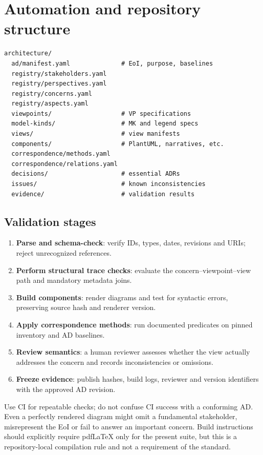 \documentclass[11pt,letterpaper]{article}
\begin{document}
\section{Automation and repository structure}
\begin{lstlisting}[caption={Illustrative architecture documentation layout}]
architecture/
  ad/manifest.yaml              # EoI, purpose, baselines
  registry/stakeholders.yaml
  registry/perspectives.yaml
  registry/concerns.yaml
  registry/aspects.yaml
  viewpoints/                   # VP specifications
  model-kinds/                  # MK and legend specs
  views/                        # view manifests
  components/                   # PlantUML, narratives, etc.
  correspondence/methods.yaml
  correspondence/relations.yaml
  decisions/                    # essential ADRs
  issues/                       # known inconsistencies
  evidence/                     # validation results
\end{lstlisting}
\subsection{Validation stages}
\begin{enumerate}
\item \textbf{Parse and schema-check}: verify IDs, types, dates, revisions and URIs; reject unrecognized references.
\item \textbf{Perform structural trace checks}: evaluate the concern--viewpoint--view path and mandatory metadata joins.
\item \textbf{Build components}: render diagrams and test for syntactic errors, preserving source hash and renderer version.
\item \textbf{Apply correspondence methods}: run documented predicates on pinned inventory and AD baselines.
\item \textbf{Review semantics}: a human reviewer assesses whether the view actually addresses the concern and records inconsistencies or omissions.
\item \textbf{Freeze evidence}: publish hashes, build logs, reviewer and version identifiers with the approved AD revision.
\end{enumerate}
\begin{Guidance}Use CI for repeatable checks; do not confuse CI success with a conforming AD. Even a perfectly rendered diagram might omit a fundamental stakeholder, misrepresent the EoI or fail to answer an important concern. Build instructions should explicitly require pdfLaTeX only for the present suite, but this is a repository-local compilation rule and not a requirement of the standard.\end{Guidance}
\end{document}
